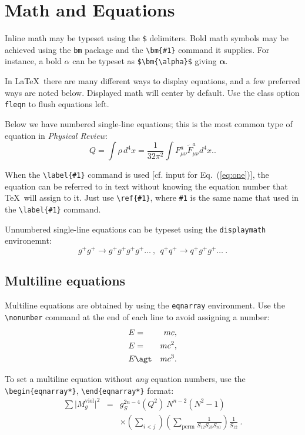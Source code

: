 \documentclass[aps,12pt]{revtex4}
\begin{document}
\section{Math and Equations}

Inline math may be typeset using the \verb+$+ delimiters. Bold math
symbols may be achieved using the \verb+bm+ package and the
\verb+\bm{#1}+ command it supplies. For instance, a bold $\alpha$ can
be typeset as \verb+$\bm{\alpha}$+ giving $\bm{\alpha}$.

In \LaTeX\ there are many different ways to display equations, and a
few preferred ways are noted below. Displayed math will center by
default. Use the class option \verb+fleqn+ to flush equations left.

Below we have numbered single-line equations; this is the most common
type of equation in \textit{Physical Review}:
\begin{equation}
  Q =  \int\rho\, d^4x = \frac{1}{32 \pi^2}\int F^a_{\mu\nu} \tilde F^a_{\mu\nu} d^4x.
\label{eq:one}.
\end{equation}

When the \verb+\label{#1}+ command is used [cf. input for
Eq.~(\ref{eq:one})], the equation can be referred to in text without
knowing the equation number that \TeX\ will assign to it. Just
use \verb+\ref{#1}+, where \verb+#1+ is the same name that used in
the \verb+\label{#1}+ command.

Unnumbered single-line equations can be typeset
using the \verb+displaymath+ environemnt:
%
\begin{displaymath}
g^+g^+ \rightarrow g^+g^+g^+g^+ \dots ~,~~q^+q^+\rightarrow
q^+g^+g^+ \dots ~.
\end{displaymath}

\subsection{Multiline equations}

Multiline equations are obtained by using the \verb+eqnarray+
environment.  Use the \verb+\nonumber+ command at the end of each line
to avoid assigning a number:
\begin{eqnarray}
E&=&mc, \label{appa}
\\
E&=&mc^2, \label{appb}
\\
E&\agt& mc^3. \label{appc}
\end{eqnarray}

To set a multiline equation without \emph{any} equation
numbers, use the \verb+\begin{eqnarray*}+,
\verb+\end{eqnarray*}+ format:
\begin{eqnarray*}
\sum \vert M^{\text{viol}}_g \vert ^2&=&g^{2n-4}_S(Q^2)~N^{n-2}
        (N^2-1)\\
 & &\times \left( \sum_{i<j}\right)
 \left(
  \sum_{\text{perm}}\frac{1}{S_{12}S_{23}S_{n1}}
 \right)
 \frac{1}{S_{12}}~.
\end{eqnarray*}
\end{document}
